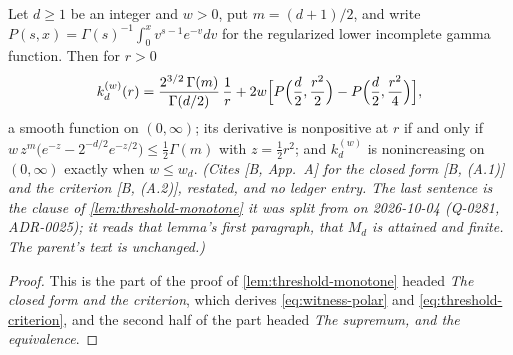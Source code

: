 \begin{lemma}
\label{lem:threshold-criterion}
\leanok
Let $d \ge 1$ be an integer and $w > 0$, put $m = (d+1)/2$, and write
$P(s,x) = \Gamma(s)^{-1}\int_0^x v^{s-1}e^{-v}dv$ for the regularized lower incomplete gamma
function. Then for $r > 0$
\[
  k^{(w)}_d(r) = \frac{2^{3/2}\,\Gamma(m)}{\Gamma(d/2)}\,\frac1r
   + 2w\Bigl[P\Bigl(\frac d2,\frac{r^2}2\Bigr) - P\Bigl(\frac d2,\frac{r^2}4\Bigr)\Bigr],
\]
a smooth function on $(0,\infty)$; its derivative is nonpositive at $r$ if and only if
$w\,z^m\bigl(e^{-z} - 2^{-d/2}e^{-z/2}\bigr) \le \tfrac12\Gamma(m)$ with $z = \tfrac12 r^2$; and
$k^{(w)}_d$ is nonincreasing on $(0,\infty)$ exactly when $w \le w_d$.
\statusT\quad\emph{(Cites [B, App.~A] for the closed form [B, (A.1)] and the criterion [B, (A.2)],
restated, and no ledger entry. The last sentence is the clause of \ref{lem:threshold-monotone} it
was split from on 2026-10-04 (Q-0281, ADR-0025); it reads that lemma's first paragraph, that $M_d$ is
attained and finite. The parent's text is unchanged.)}
\end{lemma}

\begin{proof}
\leanok
This is the part of the proof of \ref{lem:threshold-monotone} headed \emph{The closed form and the
criterion}, which derives \ref{eq:witness-polar} and \ref{eq:threshold-criterion}, and the second
half of the part headed \emph{The supremum, and the equivalence}.
\end{proof}

